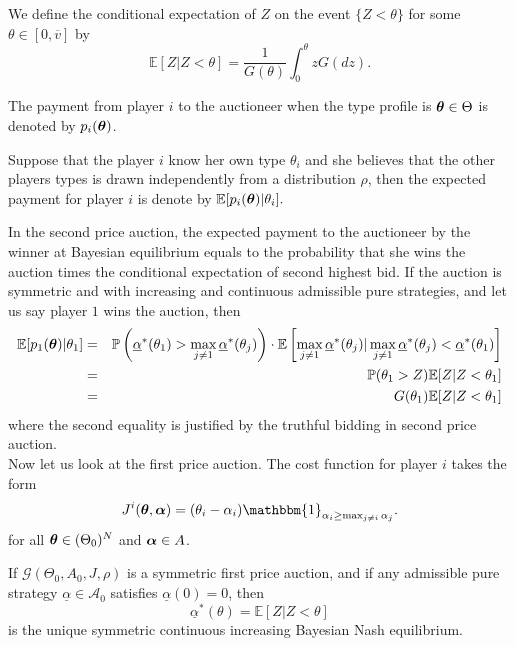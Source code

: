 We define the conditional expectation of $Z$ on the event $\{ Z < \theta\}$ for some $\theta \in [0, \overline{v}]$ by
$$
\mathbb{E}[Z | Z < \theta] = \frac{1}{G(\theta)} \int_{0}^{\theta} z G(dz).
$$



\begin{definition}
	The payment from player $i$ to the auctioneer when the type profile is $\boldsymbol{\theta} \in \Theta$ is denoted by $p_i(\boldsymbol{\theta})$.	
	
	Suppose that the player $i$ know her own type $\theta_i$ and she believes that the other players types is drawn independently from a distribution $\rho$, then the expected payment for player $i$ is denote by 
	$
		\mathbb{E}[p_i(\boldsymbol{\theta}) | \theta_i].
	$
\end{definition}

In the second price auction, the expected payment to the auctioneer by the winner at Bayesian equilibrium equals to the probability that she wins the auction times the conditional expectation of second highest bid.  If the auction is symmetric and with increasing and continuous admissible pure strategies, and let us say player $1$ wins the auction, then
\begin{eqnarray*}
\mathbb{E}[p_1(\boldsymbol{\theta})|\theta_1] &=& \mathbb{P}\left(\underline{\alpha}^*(\theta_1) > \max_{j\neq 1} \underline{\alpha}^*(\theta_j) \right) \cdot \mathbb{E}\left[ \max_{j\neq 1} \underline{\alpha}^*(\theta_j) | \max_{j \neq 1}\underline{\alpha}^*(\theta_j) < \underline{\alpha}^*(\theta_1) \right]\\
&=& \mathbb{P}(\theta_1 > Z) \mathbb{E}[Z | Z < \theta_1 ] \\
&=& G(\theta_1) \mathbb{E}[Z | Z < \theta_1] 
\end{eqnarray*}
where the second equality is justified by the truthful bidding in second price auction.\\


Now let us look at the first price auction. The cost function for player $i$ takes the form
$$
J^i(\btheta, \balpha) = (\theta_i - \alpha_i ) \mathbbm{1}_{\alpha_i \geq \max_{j \neq i} \alpha_j}.
$$
for all $\boldsymbol{\theta} \in (\Theta_0)^N$ and $\boldsymbol{\alpha} \in A$.

\begin{proposition}
	If $\mathcal{G}(\Theta_0, A_0, J, \rho)$ is a symmetric first price auction, and if any admissible pure strategy $\underline{\alpha} \in \mathcal{A}_0$ satisfies $\underline{\alpha}(0) = 0$, then
	$$
		\underline{\alpha}^*(\theta) = \mathbb{E}[Z | Z < \theta]
	$$
	is the unique symmetric continuous increasing Bayesian Nash equilibrium.	
\end{proposition}

